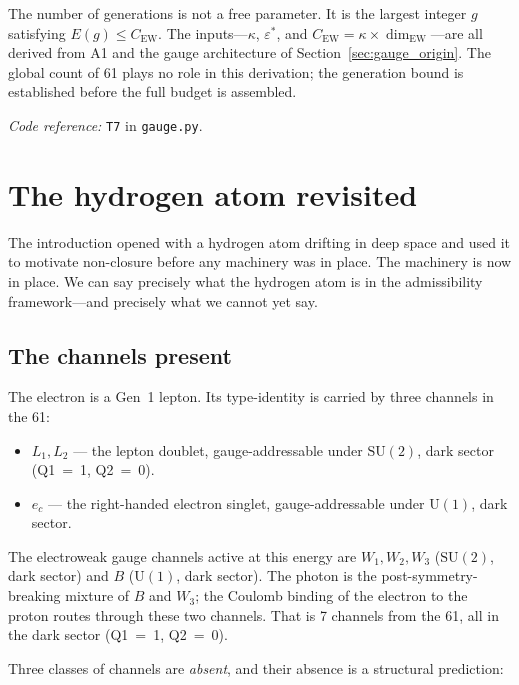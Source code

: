 \documentclass[11pt]{article}
\newenvironment{varlist}{\begin{itemize}[nosep,leftmargin=2em]}{\end{itemize}}
\newcommand{\coderef}[2]{\smallskip\noindent\textit{Code reference:} \texttt{#1} in \texttt{#2}.}
\newcommand{\SU}{\mathrm{SU}}
\newcommand{\U}{\mathrm{U}}
\begin{document}
The number of generations is not a free parameter.  It is the largest integer $g$ satisfying $E(g) \le C_{\mathrm{EW}}$.  The inputs---$\kappa$, $\varepsilon^*$, and $C_{\mathrm{EW}} = \kappa \times \dim_{\mathrm{EW}}$---are all derived from A1 and the gauge architecture of Section~\ref{sec:gauge_origin}.  The global count of 61 plays no role in this derivation; the generation bound is established before the full budget is assembled.


\coderef{T7}{gauge.py}


\section{The hydrogen atom revisited}
\label{sec:hydrogen_revisited}

The introduction opened with a hydrogen atom drifting in deep space and
used it to motivate non-closure before any machinery was in place.  The
machinery is now in place.  We can say precisely what the hydrogen atom
is in the admissibility framework---and precisely what we cannot yet say.

\subsection*{The channels present}

The electron is a Gen~1 lepton.  Its type-identity is carried by three
channels in the 61:

\begin{varlist}
\item $L_1, L_2$ --- the lepton doublet, gauge-addressable under
$\SU(2)$, dark sector (Q1~=~1, Q2~=~0).
\item $e_c$ --- the right-handed electron singlet, gauge-addressable
under $\U(1)$, dark sector.
\end{varlist}

The electroweak gauge channels active at this energy are $W_1, W_2, W_3$
($\SU(2)$, dark sector) and $B$ ($\U(1)$, dark sector).  The photon is
the post-symmetry-breaking mixture of $B$ and $W_3$; the Coulomb binding
of the electron to the proton routes through these two channels.  That is
7 channels from the 61, all in the dark sector (Q1~=~1, Q2~=~0).

Three classes of channels are \emph{absent}, and their absence is a
structural prediction:
\end{document}
